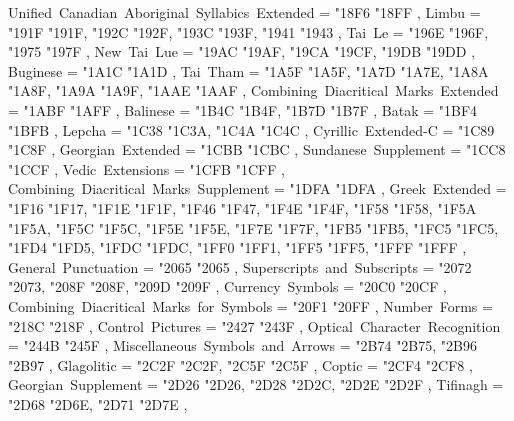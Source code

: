 {    Unified~Canadian~Aboriginal~Syllabics~Extended = { {"18F6} {"18FF} },
    Limbu                                          = { {"191F} {"191F}, {"192C} {"192F}, {"193C} {"193F}, {"1941} {"1943} },
    Tai~Le                                         = { {"196E} {"196F}, {"1975} {"197F} },
    New~Tai~Lue                                    = { {"19AC} {"19AF}, {"19CA} {"19CF}, {"19DB} {"19DD} },
    Buginese                                       = { {"1A1C} {"1A1D} },
    Tai~Tham                                       = { {"1A5F} {"1A5F}, {"1A7D} {"1A7E}, {"1A8A} {"1A8F}, {"1A9A} {"1A9F}, {"1AAE} {"1AAF} },
    Combining~Diacritical~Marks~Extended           = { {"1ABF} {"1AFF} },
    Balinese                                       = { {"1B4C} {"1B4F}, {"1B7D} {"1B7F} },
    Batak                                          = { {"1BF4} {"1BFB} },
    Lepcha                                         = { {"1C38} {"1C3A}, {"1C4A} {"1C4C} },
    Cyrillic~Extended-C                            = { {"1C89} {"1C8F} },
    Georgian~Extended                              = { {"1CBB} {"1CBC} },
    Sundanese~Supplement                           = { {"1CC8} {"1CCF} },
    Vedic~Extensions                               = { {"1CFB} {"1CFF} },
    Combining~Diacritical~Marks~Supplement         = { {"1DFA} {"1DFA} },
    Greek~Extended                                 = { {"1F16} {"1F17}, {"1F1E} {"1F1F}, {"1F46} {"1F47}, {"1F4E} {"1F4F}, {"1F58} {"1F58}, {"1F5A} {"1F5A}, {"1F5C} {"1F5C}, {"1F5E} {"1F5E}, {"1F7E} {"1F7F}, {"1FB5} {"1FB5}, {"1FC5} {"1FC5}, {"1FD4} {"1FD5}, {"1FDC} {"1FDC}, {"1FF0} {"1FF1}, {"1FF5} {"1FF5}, {"1FFF} {"1FFF} },
    General~Punctuation                            = { {"2065} {"2065} },
    Superscripts~and~Subscripts                    = { {"2072} {"2073}, {"208F} {"208F}, {"209D} {"209F} },
    Currency~Symbols                               = { {"20C0} {"20CF} },
    Combining~Diacritical~Marks~for~Symbols        = { {"20F1} {"20FF} },
    Number~Forms                                   = { {"218C} {"218F} },
    Control~Pictures                               = { {"2427} {"243F} },
    Optical~Character~Recognition                  = { {"244B} {"245F} },
    Miscellaneous~Symbols~and~Arrows               = { {"2B74} {"2B75}, {"2B96} {"2B97} },
    Glagolitic                                     = { {"2C2F} {"2C2F}, {"2C5F} {"2C5F} },
    Coptic                                         = { {"2CF4} {"2CF8} },
    Georgian~Supplement                            = { {"2D26} {"2D26}, {"2D28} {"2D2C}, {"2D2E} {"2D2F} },
    Tifinagh                                       = { {"2D68} {"2D6E}, {"2D71} {"2D7E} },
}
